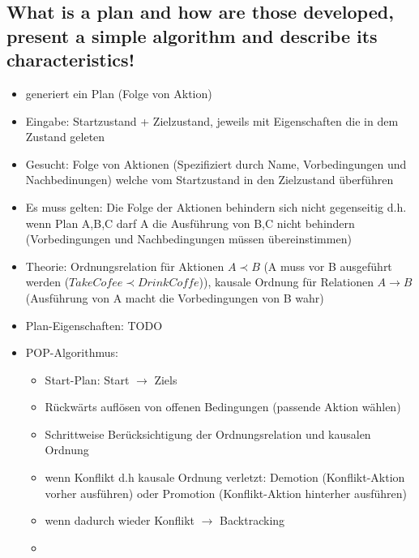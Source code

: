\subsection{What is a plan and how are those developed, present a simple algorithm and describe its characteristics!}
\begin{itemize}
	\item generiert ein Plan (Folge von Aktion)
	\item Eingabe: Startzustand + Zielzustand, jeweils mit  Eigenschaften die in dem Zustand geleten
	\item Gesucht: Folge von Aktionen (Spezifiziert durch Name, Vorbedingungen und Nachbedinungen) welche vom Startzustand in den Zielzustand überführen
	\item Es muss gelten: Die Folge der Aktionen behindern sich nicht gegenseitig d.h. wenn Plan A,B,C darf A die Ausführung von B,C nicht behindern (Vorbedingungen und Nachbedingungen müssen übereinstimmen)
	\item Theorie: Ordnungsrelation für Aktionen $A \prec B$ (A muss vor B ausgeführt werden ($TakeCofee \prec DrinkCoffe$)), kausale Ordnung für Relationen $A \rightarrow B$ (Ausführung von A macht die Vorbedingungen von B wahr)
	\item Plan-Eigenschaften: TODO
	\item POP-Algorithmus:
	\begin{itemize}
		\item Start-Plan: Start $\rightarrow$ Ziels
		\item Rückwärts auflösen von offenen Bedingungen (passende Aktion wählen)
		\item Schrittweise Berücksichtigung der Ordnungsrelation und kausalen Ordnung
		\item wenn Konflikt d.h kausale Ordnung verletzt: Demotion (Konflikt-Aktion vorher ausführen) oder Promotion (Konflikt-Aktion hinterher ausführen)
		\item wenn dadurch wieder Konflikt $\rightarrow$ Backtracking
	\end{itemize}
	\begin{itemize}
		\item 
	\end{itemize}
\end{itemize}

